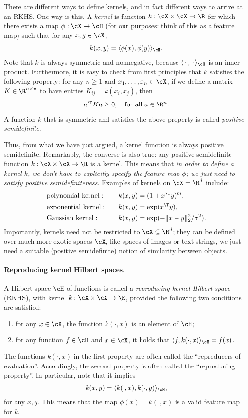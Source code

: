 \documentclass{article}
\begin{document}
There are different ways to define kernels, and in fact different ways to arrive 
at an RKHS. One way is this. A \emph{kernel} is function $k : \cX \times \cX \to 
\R$ for which there exists a map $\phi : \cX \to \cH$ (for our purposes: think
of this as a feature map) such that for any $x,y \in \cX$,  
\[
k(x,y) = \langle \phi(x), \phi(y) \rangle_\cH.
\]
Note that $k$ is always symmetric and nonnegative, because $\langle \,\cdot\,, 
\,\cdot\, \rangle_\cH$ is an inner product. Furthermore, it is easy to check
from first principles that $k$ satisfies the following property: for any $n \geq
1$ and $x_1,\dots,x_n \in \cX$, if we define a matrix $K \in \R^{n \times n}$ to 
have entries $K_{ij} = k(x_i, x_j)$, then  
\[
a^\T K a \geq 0, \quad \text{for all $a \in \R^n$}.
\]
A function $k$ that is symmetric and satisfies the above property is called 
\emph{positive semidefinite}. 

Thus, from what we have just argued, a kernel function is always positive
semidefinite. Remarkably, the converse is also true: any positive semidefinite
function $k : \cX \times \cX \to \R$ is a kernel. This means that \emph{in order
  to define a kernel $k$, we don't have to explicitly specify the feature map 
  $\phi$; we just need to satisfy positive semidefiniteness}. Examples of
kernels on $\cX = \R^d$ include: 
\begin{alignat*}{3}
&\text{polynomial kernel}: \quad && k(x,y) = (1 + x^\T y)^m, \\
&\text{exponential kernel}: \quad && k(x,y) = \exp(x^\T y), \\
&\text{Gaussian kernel}: \quad && k(x,y) = \exp(-\|x-y\|_2^2 / \sigma^2). 
\end{alignat*}
Importantly, kernels need not be restricted to $\cX \subseteq \R^d$; they can be
defined over much more exotic spaces $\cX$, like spaces of images or text
strings, we just need a suitable (positive semidefinite) notion of similarity
between objects.   

\paragraph{Reproducing kernel Hilbert spaces.} 

A Hilbert space $\cH$ of functions is called a \emph{reproducing kernel Hilbert
  space} (RKHS), with kernel $k : \cX \times \cX \to \R$, provided the following
two conditions are satisfied:  
\begin{enumerate}
\item for any $x \in \cX$, the function $k(\cdot, x)$ is an element of $\cH$;   
\item for any function $f \in \cH$ and $x \in \cX$, it holds that $\langle f,
  k(\cdot, x) \rangle_\cH = f(x)$. 
\end{enumerate}
The functions $k(\cdot, x)$ in the first property are often called the
``reproducers of evaluation''. Accordingly, the second property is often called
the ``reproducing property''. In particular, note that it implies
\[
k(x,y) = \langle k(\cdot, x), k(\cdot, y) \rangle_\cH,
\]
for any $x,y$. This means that the map $\phi(x) = k(\cdot, x)$ is a valid
feature map for $k$.  
\end{document}
